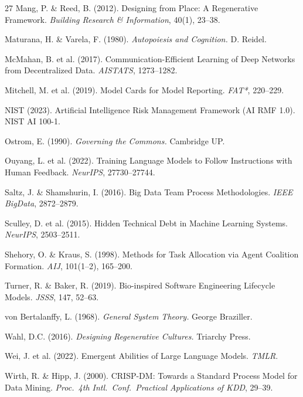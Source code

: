 \documentclass[11pt,a4paper]{article}
\begin{document}
\begin{thebibliography}{27}
Mang, P. \& Reed, B. (2012).
\newblock Designing from Place: A Regenerative Framework.
\newblock \emph{Building Research \& Information}, 40(1), 23--38.

Maturana, H. \& Varela, F. (1980).
\newblock \emph{Autopoiesis and Cognition.}
\newblock D. Reidel.

McMahan, B. et al. (2017).
\newblock Communication-Efficient Learning of Deep Networks from Decentralized Data.
\newblock \emph{AISTATS}, 1273--1282.

Mitchell, M. et al. (2019).
\newblock Model Cards for Model Reporting.
\newblock \emph{FAT*}, 220--229.

NIST (2023).
\newblock Artificial Intelligence Risk Management Framework (AI RMF 1.0).
\newblock NIST AI 100-1.

Ostrom, E. (1990).
\newblock \emph{Governing the Commons.}
\newblock Cambridge UP.

Ouyang, L. et al. (2022).
\newblock Training Language Models to Follow Instructions with Human Feedback.
\newblock \emph{NeurIPS}, 27730--27744.

Saltz, J. \& Shamshurin, I. (2016).
\newblock Big Data Team Process Methodologies.
\newblock \emph{IEEE BigData}, 2872--2879.

Sculley, D. et al. (2015).
\newblock Hidden Technical Debt in Machine Learning Systems.
\newblock \emph{NeurIPS}, 2503--2511.

Shehory, O. \& Kraus, S. (1998).
\newblock Methods for Task Allocation via Agent Coalition Formation.
\newblock \emph{AIJ}, 101(1--2), 165--200.

Turner, R. \& Baker, R. (2019).
\newblock Bio-inspired Software Engineering Lifecycle Models.
\newblock \emph{JSSS}, 147, 52--63.

von Bertalanffy, L. (1968).
\newblock \emph{General System Theory.}
\newblock George Braziller.

Wahl, D.C. (2016).
\newblock \emph{Designing Regenerative Cultures.}
\newblock Triarchy Press.

Wei, J. et al. (2022).
\newblock Emergent Abilities of Large Language Models.
\newblock \emph{TMLR}.

Wirth, R. \& Hipp, J. (2000).
\newblock CRISP-DM: Towards a Standard Process Model for Data Mining.
\newblock \emph{Proc.\ 4th Intl.\ Conf.\ Practical Applications of KDD}, 29--39.

\end{thebibliography}
\end{document}
